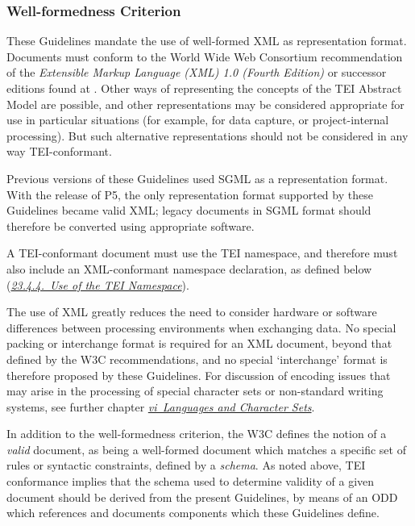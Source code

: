 \subsubsection[{Well-formedness Criterion}]{Well-formedness Criterion}\label{CFWF}\par
These Guidelines mandate the use of well-formed XML as representation format. Documents must conform to the World Wide Web Consortium recommendation of the \textit{Extensible Markup Language (XML) 1.0 (Fourth Edition)} or successor editions found at . Other ways of representing the concepts of the TEI Abstract Model are possible, and other representations may be considered appropriate for use in particular situations (for example, for data capture, or project-internal processing). But such alternative representations  should not be considered in any way TEI-conformant.\par
Previous versions of these Guidelines used SGML as a representation format. With the release of P5, the only representation format supported by these Guidelines became valid XML; legacy documents in SGML format should therefore be converted using appropriate software.\par
A TEI-conformant document must use the TEI namespace, and therefore must also include an XML-conformant namespace declaration, as defined below (\textit{\hyperref[CFNS]{23.4.4.\ Use of the TEI Namespace}}).\par
The use of XML greatly reduces the need to consider hardware or software differences between processing environments when exchanging data. No special packing or interchange format is required for an XML document, beyond that defined by the W3C recommendations, and no special ‘interchange’ format is therefore proposed by these Guidelines. For discussion of encoding issues that may arise in the processing of special character sets or non-standard writing systems, see further chapter \textit{\hyperref[CH]{vi\ Languages and Character Sets}}.\par
In addition to the well-formedness criterion, the W3C defines the notion of a \textit{valid} document, as being a well-formed document which matches a specific set of rules or syntactic constraints, defined by a \textit{schema}. As noted above, TEI conformance implies that the schema used to determine validity of a given document should be derived from the present Guidelines, by means of an ODD which references and documents components which these Guidelines define.
